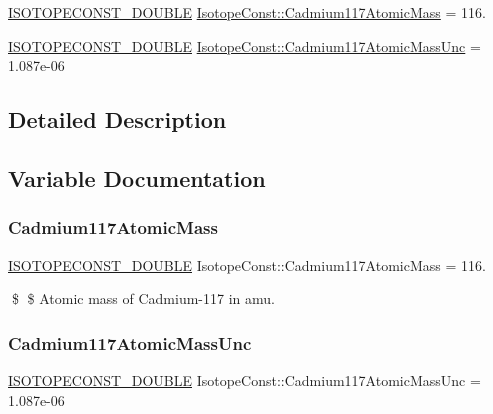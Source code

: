 \begin{DoxyCompactItemize}
\item 
\mbox{\hyperlink{group___isotope_const-_macros_ga8f45a7272ce02c0b4c65c44636ed719a}{I\+S\+O\+T\+O\+P\+E\+C\+O\+N\+S\+T\+\_\+\+D\+O\+U\+B\+LE}} \mbox{\hyperlink{group___isotope_const-_cadmium-_cd117_gad56c47e4b367642eb18b1db492268a74}{Isotope\+Const\+::\+Cadmium117\+Atomic\+Mass}} = 116.
\item 
\mbox{\hyperlink{group___isotope_const-_macros_ga8f45a7272ce02c0b4c65c44636ed719a}{I\+S\+O\+T\+O\+P\+E\+C\+O\+N\+S\+T\+\_\+\+D\+O\+U\+B\+LE}} \mbox{\hyperlink{group___isotope_const-_cadmium-_cd117_ga04dd07dd5b4e95a0d688d1e3e609ed8a}{Isotope\+Const\+::\+Cadmium117\+Atomic\+Mass\+Unc}} = 1.\+087e-\/06
\end{DoxyCompactItemize}


\subsection{Detailed Description}


\subsection{Variable Documentation}
\mbox{\label{group___isotope_const-_cadmium-_cd117_gad56c47e4b367642eb18b1db492268a74}} 
\subsubsection{\texorpdfstring{Cadmium117\+Atomic\+Mass}{Cadmium117AtomicMass}}
{\footnotesize\ttfamily \mbox{\hyperlink{group___isotope_const-_macros_ga8f45a7272ce02c0b4c65c44636ed719a}{I\+S\+O\+T\+O\+P\+E\+C\+O\+N\+S\+T\+\_\+\+D\+O\+U\+B\+LE}} Isotope\+Const\+::\+Cadmium117\+Atomic\+Mass = 116.}

\$ \$ Atomic mass of Cadmium-\/117 in amu. \mbox{\label{group___isotope_const-_cadmium-_cd117_ga04dd07dd5b4e95a0d688d1e3e609ed8a}} 
\subsubsection{\texorpdfstring{Cadmium117\+Atomic\+Mass\+Unc}{Cadmium117AtomicMassUnc}}
{\footnotesize\ttfamily \mbox{\hyperlink{group___isotope_const-_macros_ga8f45a7272ce02c0b4c65c44636ed719a}{I\+S\+O\+T\+O\+P\+E\+C\+O\+N\+S\+T\+\_\+\+D\+O\+U\+B\+LE}} Isotope\+Const\+::\+Cadmium117\+Atomic\+Mass\+Unc = 1.\+087e-\/06}

